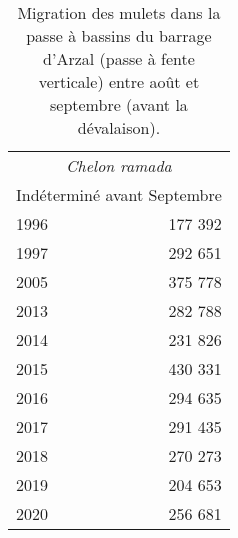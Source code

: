 \begin{table}[ht]
\centering
\begin{tabular}{lr}
  \toprule
  \multicolumn{2}{c}{\textit{Chelon ramada}}  \\ 
		\multicolumn{2}{c}{Indéterminé avant Septembre}\\ 
		 \midrule
1996 & 177 392 \\ 
  1997 & 292 651 \\ 
  2005 & 375 778 \\ 
  2013 & 282 788 \\ 
  2014 & 231 826 \\ 
  2015 & 430 331 \\ 
  2016 & 294 635 \\ 
  2017 & 291 435 \\ 
  2018 & 270 273 \\ 
  2019 & 204 653 \\ 
  2020 & 256 681 \\ 
   \bottomrule
\end{tabular}
\caption{Migration des mulets dans la passe à bassins du barrage d'Arzal 
		(passe à fente verticale) entre août et septembre (avant la dévalaison).} 
\label{table_bilanannuel_mulets_0108}
\end{table}

